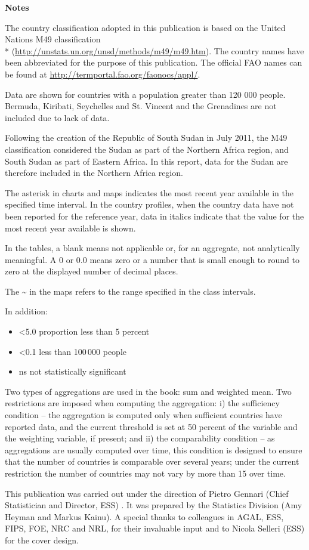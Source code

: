 \onecolumn
\LARGE
\textbf{Notes}

\footnotesize
The country classification adopted in this publication is based on the United Nations M49 classification \\* (\url{http://unstats.un.org/unsd/methods/m49/m49.htm}). The country names have been abbreviated for the purpose of this publication. The official FAO names can be found at \url{http://termportal.fao.org/faonocs/appl/}.

Data are shown for countries with a population greater than 120 000 people. Bermuda, Kiribati, Seychelles and St. Vincent and the Grenadines are not included due to lack of data.

Following the creation of the Republic of South Sudan in July 2011, the M49 classification considered the Sudan as part of the Northern Africa region, and South Sudan as part of Eastern Africa. In this report, data for the Sudan are therefore included in the Northern Africa region.

The asterisk in charts and maps indicates the most recent year available in the specified time interval. In the country profiles, when the country data have not been reported for the reference year, data in italics indicate that the value for the most recent year available is shown.

In the tables, a blank means not applicable or, for an aggregate, not analytically meaningful. A 0 or 0.0 means zero or a number that is small enough to round to zero at the displayed number of decimal places.

The \textasciitilde{} in the maps refers to the range specified in the class intervals.

In addition:
\begin{itemize}
\item <5.0 proportion less than 5 percent
\item <0.1 less than 100\,000 people
\item ns not statistically significant 
\end{itemize}

Two types of aggregations are used in the book: sum and weighted mean. Two restrictions are imposed when computing the aggregation: i) the sufficiency condition – the aggregation is computed only when sufficient countries have reported data, and the current threshold is set at 50 percent of the variable and the weighting variable, if present; and ii) the comparability condition – as aggregations are usually computed over time, this condition is designed to ensure that the number of countries is comparable over several years; under the current restriction the number of countries may not vary by more than 15 over time.

This publication was carried out under the direction of Pietro Gennari (Chief Statistician and Director, ESS) . It was prepared by the Statistics Division (Amy Heyman and Markus Kainu). A special thanks to colleagues in AGAL, ESS, FIPS, FOE, NRC and NRL, for their invaluable input and to Nicola Selleri (ESS) for the cover design.

